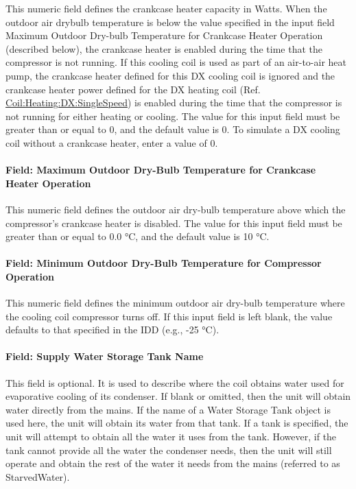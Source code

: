 This numeric field defines the crankcase heater capacity in Watts. When the outdoor air drybulb temperature is below the value specified in the input field Maximum Outdoor Dry-bulb Temperature for Crankcase Heater Operation (described below), the crankcase heater is enabled during the time that the compressor is not running. If this cooling coil is used as part of an air-to-air heat pump, the crankcase heater defined for this DX cooling coil is ignored and the crankcase heater power defined for the DX heating coil (Ref. \hyperref[coilheatingdxsinglespeed]{Coil:Heating:DX:SingleSpeed}) is enabled during the time that the compressor is not running for either heating or cooling. The value for this input field must be greater than or equal to 0, and the default value is 0. To simulate a DX cooling coil without a crankcase heater, enter a value of 0.

\paragraph{Field: Maximum Outdoor Dry-Bulb Temperature for Crankcase Heater Operation}\label{field-maximum-outdoor-dry-bulb-temperature-for-crankcase-heater-operation-3}

This numeric field defines the outdoor air dry-bulb temperature above which the compressor's crankcase heater is disabled. The value for this input field must be greater than or equal to 0.0 °C, and the default value is 10 °C.

\paragraph{Field: Minimum Outdoor Dry-Bulb Temperature for Compressor Operation}

This numeric field defines the minimum outdoor air dry-bulb temperature where the cooling coil compressor turns off. If this input field is left blank, the value defaults to that specified in the IDD (e.g., -25 °C).

\paragraph{Field: Supply Water Storage Tank Name}\label{field-supply-water-storage-tank-name-4-000}

This field is optional. It is used to describe where the coil obtains water used for evaporative cooling of its condenser. If blank or omitted, then the unit will obtain water directly from the mains. If the name of a Water Storage Tank object is used here, the unit will obtain its water from that tank. If a tank is specified, the unit will attempt to obtain all the water it uses from the tank. However, if the tank cannot provide all the water the condenser needs, then the unit will still operate and obtain the rest of the water it needs from the mains (referred to as StarvedWater).

